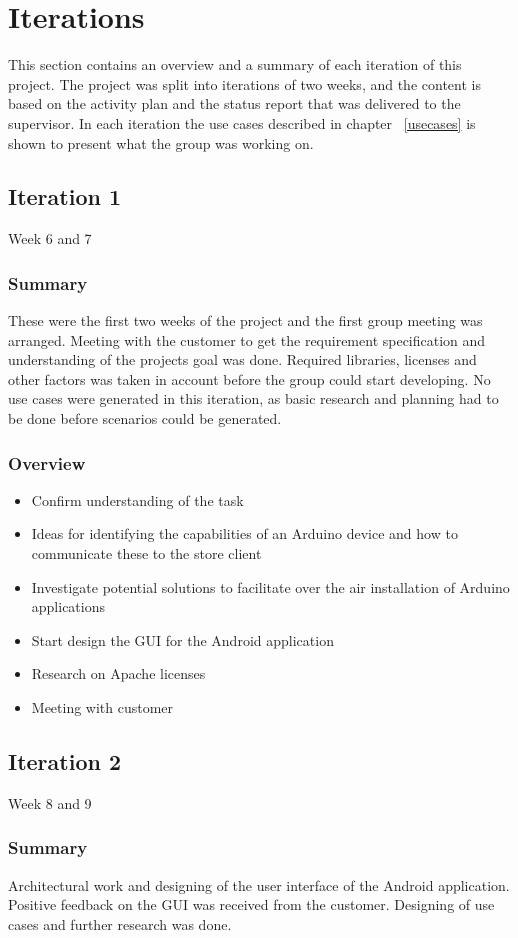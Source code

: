 \chapter{Iterations}

This section contains an overview and a summary of each iteration of this project. The project was split into
iterations of two weeks, and the content is based on the activity plan and the status report that was delivered to the supervisor. In each iteration the use cases described in chapter ~\ref{usecases} is shown to present what the group was working on.

\section{Iteration 1}
Week 6 and 7
\subsection{Summary}
	These were the first two weeks of the project and the first group meeting was arranged.	Meeting with the customer to get the requirement specification and understanding of the projects goal was done.	Required libraries, licenses and other factors was taken in account before the group could start developing. No use cases were generated in this iteration, as basic research and planning had to be done before scenarios could be generated.
\subsection{Overview}
\begin{itemize}
	\item{Confirm understanding of the task}
	\item{Ideas for identifying the capabilities of an Arduino device and how to communicate these to the store client}
	\item{Investigate potential solutions to facilitate over the air installation of Arduino applications}
	\item{Start design the GUI for the Android application}
	\item{Research on Apache licenses}
	\item{Meeting with customer}
\end{itemize}

\section{Iteration 2}
Week 8 and 9
\subsection{Summary}
	Architectural work and designing of the user interface of the Android application. Positive feedback on the GUI was received from the customer. Designing of use cases and further research was done.
